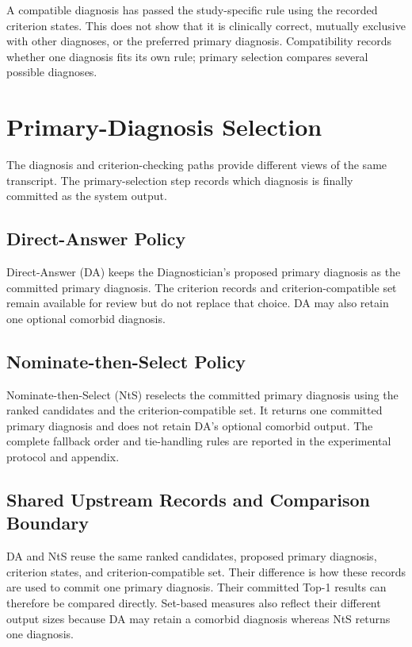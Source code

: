 A compatible diagnosis has passed the study-specific rule using the recorded criterion states. This does not show that it is clinically correct, mutually exclusive with other diagnoses, or the preferred primary diagnosis. Compatibility records whether one diagnosis fits its own rule; primary selection compares several possible diagnoses.

\section{Primary-Diagnosis Selection}
\label{sec:primary-selection}

The diagnosis and criterion-checking paths provide different views of the same transcript. The primary-selection step records which diagnosis is finally committed as the system output.

\subsection{Direct-Answer Policy}
\label{sec:direct-answer-policy}

Direct-Answer (DA) keeps the Diagnostician's proposed primary diagnosis as the committed primary diagnosis. The criterion records and criterion-compatible set remain available for review but do not replace that choice. DA may also retain one optional comorbid diagnosis.

\subsection{Nominate-then-Select Policy}
\label{sec:nominate-then-select-policy}

Nominate-then-Select (NtS) reselects the committed primary diagnosis using the ranked candidates and the criterion-compatible set. It returns one committed primary diagnosis and does not retain DA's optional comorbid output. The complete fallback order and tie-handling rules are reported in the experimental protocol and appendix.

\subsection{Shared Upstream Records and Comparison Boundary}
\label{sec:da-nts-relationship}
\label{sec:primary-selection-boundary}

DA and NtS reuse the same ranked candidates, proposed primary diagnosis, criterion states, and criterion-compatible set. Their difference is how these records are used to commit one primary diagnosis. Their committed Top-1 results can therefore be compared directly. Set-based measures also reflect their different output sizes because DA may retain a comorbid diagnosis whereas NtS returns one diagnosis.

